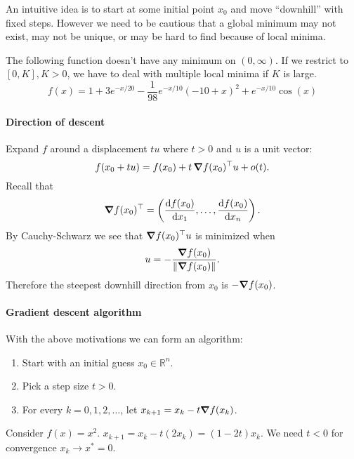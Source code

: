 An intuitive idea is to start at some initial point $x_0$ and move ``downhill'' with fixed steps. However we need to be cautious that a global minimum may not exist, may not be unique, or may be hard to find because of local minima. 

\begin{example}
    The following function doesn't have any minimum on $ (0,\infty) $. If we restrict to $ [0,K],K> 0 $, we have to deal with multiple local minima if $K$ is large. 
    \[
        f(x) = 1+3 e^{-x / 2 0}-\frac{1}{98} e^{-x / 1 0}(-10+x)^2+e^{-x / 1 0} \cos (x)
    \]
\end{example}

\paragraph{Direction of descent} 
Expand $f$ around a displacement $t u$ where $t>0$ and $u$ is a unit vector: 
\[
    f(x_0 + tu) = f(x_0) + t\, \grad f(x_0)^\top u + o(t).
\] 
Recall that 
\[
    \grad f(x_0) ^\top = \left( \frac{\mathrm{d}f(x_0)}{\mathrm{d}x_1},\dots, \frac{\mathrm{d}f(x_0)}{\mathrm{d}x_n}   \right). 
\]
By Cauchy-Schwarz we see that $ \grad f(x_0)^\top u $ is minimized when 
\[
    u = -\frac{\grad f(x_0)}{\left\| \grad f(x_0) \right\|}.
\]
Therefore the steepest downhill direction from $x_0$ is $ - \grad f(x_0) $.

\paragraph{Gradient descent algorithm}
With the above motivations we can form an algorithm: 
\begin{framed}\vspace{-0.4em}
\begin{enumerate}
    \item Start with an initial guess $x_0\in \mathbb{R}^{n}$.
    \item Pick a step size $t>0$. 
    \item For every $k=0,1,2,\dots$, let $ x_{k+1} = x_k - t \grad f(x_k) $.
\end{enumerate}
\end{framed}
\begin{example}
    Consider $ f(x)=x^2 $. $ x_{k+1} = x_k - t(2x_k) = (1-2t)x_k $. We need $ t<0 $ for convergence $ x_k\to x^* = 0 $.
\end{example}

